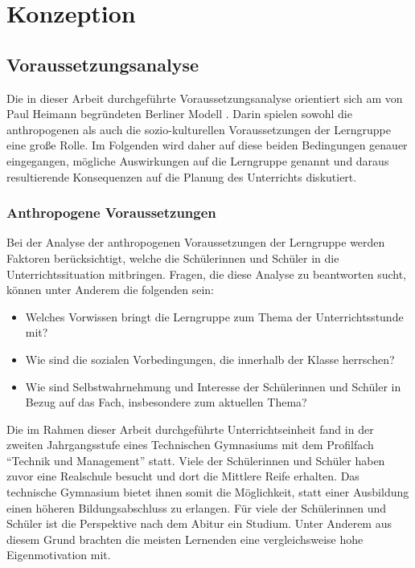 \section{Konzeption}
\label{sec:konzeption}

\subsection{Voraussetzungsanalyse}
\label{sec:voraussetzungsanalyse}

Die in dieser Arbeit durchgeführte Voraussetzungsanalyse orientiert sich am von Paul Heimann begründeten Berliner Modell \cite[S.~41--70]{arnold2015}.
Darin spielen sowohl die anthropogenen als auch die sozio-kulturellen Voraussetzungen der Lerngruppe eine große Rolle.
Im Folgenden wird daher auf diese beiden Bedingungen genauer eingegangen, mögliche Auswirkungen auf die Lerngruppe genannt und daraus resultierende Konsequenzen auf die Planung des Unterrichts diskutiert.

\subsubsection{Anthropogene Voraussetzungen}
\label{sec:anthropogene-voraussetzungen}

Bei der Analyse der anthropogenen Voraussetzungen der Lerngruppe werden Faktoren berücksichtigt, welche die Schülerinnen und Schüler in die Unterrichtssituation mitbringen.
Fragen, die diese Analyse zu beantworten sucht, können unter Anderem die folgenden sein:
\begin{itemize}
	\item Welches Vorwissen bringt die Lerngruppe zum Thema der Unterrichtsstunde mit?
	\item Wie sind die sozialen Vorbedingungen, die innerhalb der Klasse herrschen?
	\item Wie sind Selbstwahrnehmung und Interesse der Schülerinnen und Schüler in Bezug auf das Fach, insbesondere zum aktuellen Thema?
\end{itemize}

Die im Rahmen dieser Arbeit durchgeführte Unterrichtseinheit fand in der zweiten Jahrgangsstufe eines Technischen Gymnasiums mit dem Profilfach ``Technik und Management'' statt.
Viele der Schülerinnen und Schüler haben zuvor eine Realschule besucht und dort die Mittlere Reife erhalten.
Das technische Gymnasium bietet ihnen somit die Möglichkeit, statt einer Ausbildung einen höheren Bildungsabschluss zu erlangen.
Für viele der Schülerinnen und Schüler ist die Perspektive nach dem Abitur ein Studium.
Unter Anderem aus diesem Grund brachten die meisten Lernenden eine vergleichsweise hohe Eigenmotivation mit.

